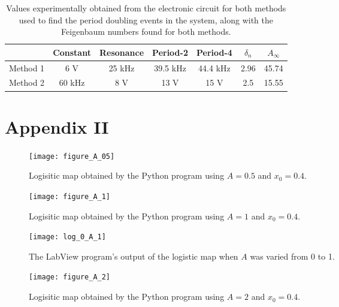 \documentclass[12pt]{report}
\theoremstyle{definition}
\begin{document}
\begin{table}[htbp]
\centering
\caption{Values experimentally obtained from the electronic circuit for both methods used to find the period doubling events in the system, along with the Feigenbaum numbers found for both methods.}
\begin{tabular}{|c|c|c|c|c|c|c|}
\hline
 & Constant & Resonance & Period-2 & Period-4 &\multicolumn{1}{c|}{$\delta_n$} & $A_\infty$\\ \hline
Method 1 & 6 V & 25 kHz & 39.5 kHz & 44.4 kHz & 2.96 &45.74 \\ \hline
Method 2 & 60 kHz & 8 V & 13 V & 15 V & 2.5&15.55 \\ \hline
\end{tabular}
\label{electroniccircuit}
\end{table}



\clearpage




\section*{Appendix II}

\begin{figure}[!htb]
\centering
\texttt{[image: figure\_A\_05]}
\caption{Logisitic map obtained by the Python program using $A=0.5$ and $x_0=0.4$. \label{fig:A0.5}}
\end{figure}

\begin{figure}[!htb]
\centering
\texttt{[image: figure\_A\_1]}
\caption{Logisitic map obtained by the Python program using $A=1$ and $x_0=0.4$. \label{fig:A_1}}
\end{figure}


\begin{figure}[!htb]
\centering
\texttt{[image: log\_0\_A\_1]}
\caption{The LabView program's output of the logistic map when $A$ was varied from 0 to 1. \label{log01}}
\end{figure}

\begin{figure}[!htb]
\centering
\texttt{[image: figure\_A\_2]}
\caption{Logisitic map obtained by the Python program using $A=2$ and $x_0=0.4$. \label{fig:A_2}}
\end{figure}
\end{document}
